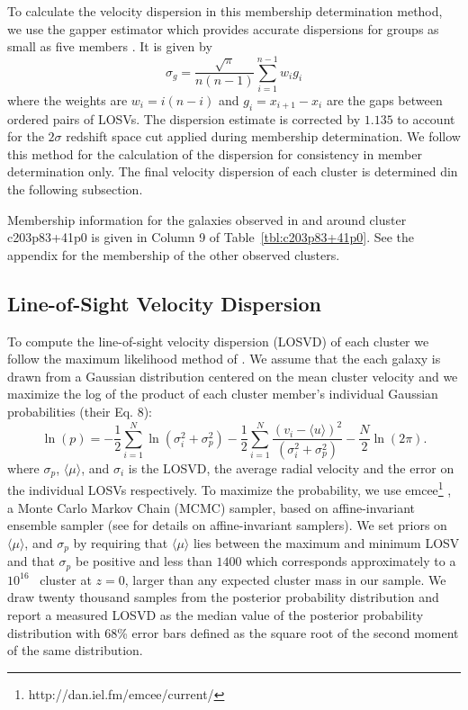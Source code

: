 To calculate the velocity dispersion in this membership determination method, we use the gapper estimator \citep{Beers1990} which provides accurate dispersions for groups as small as five members \citep{Hou2009}. It is given by 
\begin{equation}
	\sigma_g = \frac{\sqrt{\pi}}{n(n-1)} \sum_{i=1}^{n-1} w_i g_i
\end{equation}
where the weights are $w_i = i(n-i)$ and $g_i = x_{i+1} - x_i$ are the gaps between ordered pairs of LOSVs. The dispersion estimate is corrected by $1.135$ to account for the $2\sigma$ redshift space cut applied during membership determination. We follow this method for the calculation of the dispersion for consistency in member determination only. The final velocity dispersion of each cluster is determined din the following subsection.

Membership information for the galaxies observed in and around cluster c203p83+41p0 is given in Column 9 of Table~\ref{tbl:c203p83+41p0}. See the appendix for the membership of the other observed clusters.

\subsection{Line-of-Sight Velocity Dispersion}\label{sec:LOSVD}
To compute the line-of-sight velocity dispersion (LOSVD) of each cluster we follow the maximum likelihood method of \cite{Walker2006}. We assume that the each galaxy is drawn from a Gaussian distribution centered on the mean cluster velocity and we maximize the log of the product of each cluster member's individual Gaussian probabilities (their Eq. 8):
\begin{equation}
  \label{eq:log}
\ln(p)=-\frac{1}{2}\sum_{i=1}^{N}\ln(\sigma_i^2+\sigma_p^2)-\frac{1}{2}\sum_{i=1}^N\frac{(v_i-\langle u \rangle)^2}{(\sigma_i^2+\sigma_p^2)}-\frac{N}{2}\ln(2\pi).
\end{equation}
where $\sigma_p$, $\langle\mu\rangle$, and $\sigma_i$ is the LOSVD, the average radial velocity and the error on the individual LOSVs respectively. To maximize the probability, we use {\sc emcee}\footnote{http://dan.iel.fm/emcee/current/} \citep{Foreman-Mackey2013}, a Monte Carlo Markov Chain (MCMC) sampler, based on affine-invariant ensemble sampler (see \citealt{Goodman2010} for details on affine-invariant samplers). We set priors on $\langle\mu\rangle$, and $\sigma_p$ by requiring that $\langle\mu\rangle$ lies between the maximum and minimum LOSV and that $\sigma_p$ be positive and less than $1400$ \kms which corresponds approximately to a $10^{16}$ \Msol\ cluster at $z=0$, larger than any expected cluster mass in our sample. We draw twenty thousand samples from the posterior probability distribution and report a measured LOSVD as the median value of the posterior probability distribution with 68\% error bars defined as the square root of the second moment of the same distribution.

